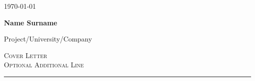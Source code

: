 \documentclass[12pt]{article}
\begin{document}
	
	\begin{flushright}
		\today
	\end{flushright}
	{\Large \textbf{Name Surname}}
	
	{\large Project/University/Company}
	
	\textsc{Cover Letter} \\
	\textsc{Optional Additional Line} %
	
	\rule{\linewidth}{0.5pt}
	
	\lipsum
	
	
\end{document}
